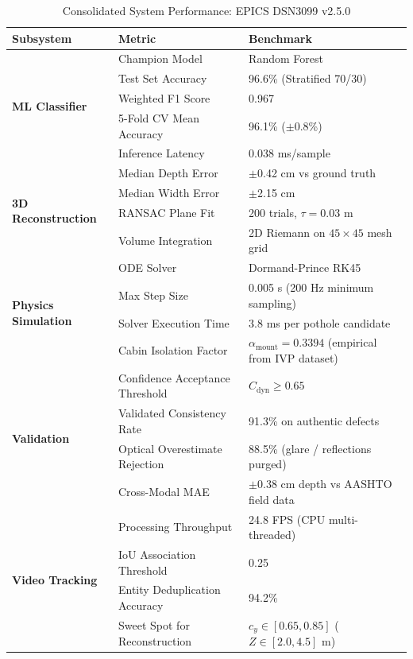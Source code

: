 \begin{table}[htbp]
\centering
\small
\caption{Consolidated System Performance: EPICS DSN3099 v2.5.0}
\label{tab:consolidated_metrics}
\begin{tabularx}{\textwidth}{lp{5.0cm}p{4.2cm}}
\toprule
\textbf{Subsystem} & \textbf{Metric} & \textbf{Benchmark} \\
\midrule
\multirow{5}{*}{\textbf{ML Classifier}} 
& Champion Model & Random Forest \\
& Test Set Accuracy & 96.6\% (Stratified 70/30) \\
& Weighted F1 Score & 0.967 \\
& 5-Fold CV Mean Accuracy & 96.1\% ($\pm$0.8\%) \\
& Inference Latency & 0.038 ms/sample \\
\midrule
\multirow{4}{*}{\textbf{3D Reconstruction}} 
& Median Depth Error & $\pm$0.42 cm vs ground truth \\
& Median Width Error & $\pm$2.15 cm \\
& RANSAC Plane Fit & 200 trials, $\tau = 0.03$ m \\
& Volume Integration & 2D Riemann on $45\times45$ mesh grid \\
\midrule
\multirow{4}{*}{\textbf{Physics Simulation}} 
& ODE Solver & Dormand-Prince RK45 \\
& Max Step Size & 0.005 s (200 Hz minimum sampling) \\
& Solver Execution Time & 3.8 ms per pothole candidate \\
& Cabin Isolation Factor & $\alpha_{\text{mount}} = 0.3394$ (empirical from IVP dataset) \\
\midrule
\multirow{4}{*}{\textbf{Validation}} 
& Confidence Acceptance Threshold & $C_{\text{dyn}} \ge 0.65$ \\
& Validated Consistency Rate & 91.3\% on authentic defects \\
& Optical Overestimate Rejection & 88.5\% (glare / reflections purged) \\
& Cross-Modal MAE & $\pm$0.38 cm depth vs AASHTO field data \\
\midrule
\multirow{4}{*}{\textbf{Video Tracking}} 
& Processing Throughput & 24.8 FPS (CPU multi-threaded) \\
& IoU Association Threshold & 0.25 \\
& Entity Deduplication Accuracy & 94.2\% \\
& Sweet Spot for Reconstruction & $c_y \in [0.65, 0.85]$ ($Z \in [2.0, 4.5]$ m) \\

\end{tabularx}
\end{table}
